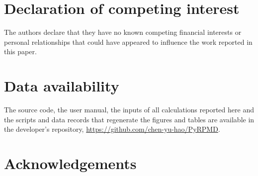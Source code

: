 \documentclass[preprint,12pt]{elsarticle}
\begin{document}
\section*{Declaration of competing interest}
The authors declare that they have no known competing financial interests or personal relationships that could have appeared to influence the work reported in this paper.


\section*{Data availability}
The source code, the user manual, the inputs of all calculations reported here and the scripts and data records that regenerate the figures and tables are available in the developer's repository, \url{https://github.com/chen-yu-hao/PyRPMD}.

\section*{Acknowledgements}



\end{document}

